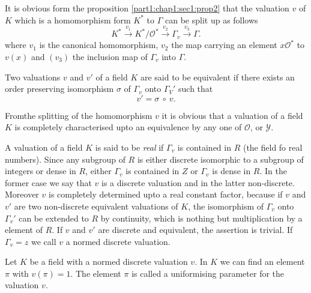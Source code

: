 It is obvious form the proposition \ref{part1:chap1:sec1:prop2} that
the valuation $v$ of $K$ 
which is a homomorphism form $K^*$ to $\Gamma $ can be
split up as follows  
$$
K^* \xrightarrow{v_1} K^* / \mathscr{O}^* \xrightarrow{v_2} \Gamma_v
\xrightarrow{v_3} \Gamma. 
$$
where $v_1$ is the canonical homomorphism, $v_2$ the map carrying an
element $x \mathscr{O}^* $ to $v (x)$ and $(v_3)$  the inclusion map
of $\Gamma_v$ into $\Gamma$. 

\begin{defi*}
  Two valuations $v$ and $v'$  of a field $K$ are said to be
  equivalent if there exists an order preserving isomorphism $\sigma$
  of $\Gamma_v$ onto $\Gamma_V'$ such that 
  $$
  v' = \sigma ~\circ~ v.
  $$
\end{defi*}

From\pageoriginale the splitting of the homomorphism $v$ it is obvious that a
valuation of a field $K$ is completely characterised upto an
equivalence by any one of $\mathscr{O}$, or $\mathscr{Y}$. 

A valuation of a field $K$ is said to be \textit{real} if $\Gamma_v$
is contained in $R$ (the field fo real numbers). Since any subgroup of
$R$ is either discrete \iec  isomorphic to a subgroup of integers or
dense in $R$, either $\Gamma_v$ is contained in $Z$ or $\Gamma_v$ is
dense in $R$. In the former case we say that $v$ is a discrete
valuation and in the latter non-discrete. Moreover $v$ is completely
determined upto a real constant factor, because if $v$ and $v'$ are
two non-discrete equivalent valuations of $K$, the isomorphism of
$\Gamma_v$ onto $\Gamma_v'$ can be extended to $R$ by continuity,
which is nothing but multiplication by a element of $R$. If $v$ and
$v'$ are discrete and equivalent, the assertion is trivial. If
$\Gamma_v = z$ we call $v$ a normed discrete valuation.  

\begin{defi*}
  Let $K$ be a field with a normed discrete valuation $v$. In $K$ we
  can find an element $\pi$ with $v(\pi)=1$. The element $\pi$ is
  called a uniformising parameter for the valuation $v$. 
\end{defi*}

